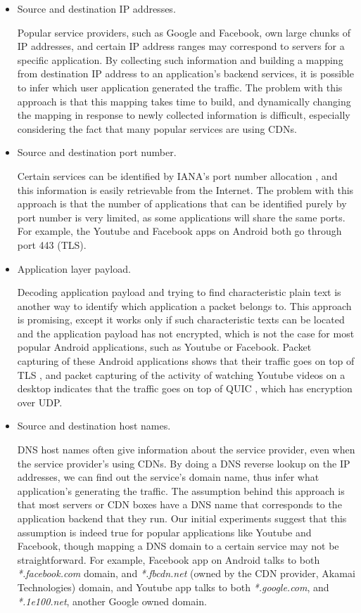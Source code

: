 \begin{itemize}
	
	\item Source and destination IP addresses. 
	
	Popular service providers, such as Google and Facebook, own large chunks of IP addresses, and certain IP address ranges may correspond to servers for a specific application. By collecting such information and building a  mapping from destination IP address to an application's backend services, it is possible to infer which user application generated the traffic. The problem with this approach is that this mapping takes time to build, and dynamically changing the mapping in response to newly collected information is difficult, especially considering the fact that many popular services are using CDNs.
	
	\item Source and destination port number. 
	
	Certain services can be identified by IANA's port number allocation \cite{touch2013service}, and this information is easily retrievable from the Internet. The problem with this approach is that the number of applications that can be identified purely by port number is very limited, as some applications will share the same ports. For example, the Youtube and Facebook apps on Android both go through port 443 (TLS).
	
	\item Application layer payload. 
	
	Decoding application payload and trying to find characteristic plain text is another way to identify which application a packet belongs to. This approach is promising, except it works only if such characteristic texts can be located and the application payload has not encrypted, which is not the case for most popular Android applications, such as Youtube or Facebook. Packet capturing of these Android applications shows that their traffic goes on top of TLS \cite{dierks2008transport}, and packet capturing of the activity of watching Youtube videos on a desktop indicates that the traffic goes on top of QUIC \cite{QUIC}, which has encryption over UDP.
	
	\item Source and destination host names. 
	
	DNS host names often give information about the service provider, even when the service provider's using CDNs. By doing a DNS reverse lookup \cite{eidnes1998classless} on the IP addresses, we can find out the service's domain name, thus infer what application's generating the traffic. The assumption behind this approach is that most servers or CDN boxes have a DNS name that corresponds to the application backend that they run. Our initial experiments suggest that this assumption is indeed true for popular applications like Youtube and Facebook, though mapping a DNS domain to a certain service may not be straightforward. For example, Facebook app on Android talks to both \textit{*.facebook.com} domain, and \textit{*.fbcdn.net} (owned by the CDN provider, Akamai Technologies) domain, and Youtube app talks to both \textit{*.google.com}, and \textit{*.1e100.net}, another Google owned domain. 
	

\end{itemize}
